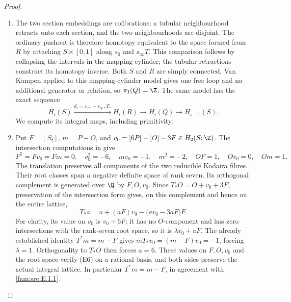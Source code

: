 \begin{proof}
\begin{enumerate}[label=\arabic*.,leftmargin=*]
\item The two section embeddings are cofibrations: a tubular neighbourhood
retracts onto each section, and the two neighbourhoods are disjoint.
The ordinary pushout is therefore homotopy equivalent to the space
formed from $R$ by attaching $S\times[0,1]$ along
$s_0$ and $s_\infty T$. This comparison follows by collapsing the
intervals in the mapping cylinder; the tubular retractions construct
its homotopy inverse. Both $S$ and $R$ are simply connected. Van
Kampen applied to this mapping-cylinder model gives one free loop
and no additional generator or relation, so $\pi_1(Q)=\Z$.
The same model has the exact sequence
\[
 H_i(S)\xrightarrow{d_i=s_{0*}-s_{\infty*}T_*}H_i(R)
 \longrightarrow H_i(Q)\longrightarrow H_{i-1}(S).             \tag{E4}
\]
We compute its integral maps, including primitivity.

\item Put $F=[S_t]$, $m=P-O$, and
$v_0=[6P]-[O]-3F\in H_2(S;\Z)$. The intersection computations in
\cite[Lemma 2.1]{Engel2026} give
\[
 F^2=Fv_0=Fm=0,\quad v_0^2=-6,\quad mv_0=-1,\quad m^2=-2,
 \quad OF=1,\quad Ov_0=0,\quad Om=1.                         \tag{E5}
\]
The translation preserves all components of the two reducible
Kodaira fibres. Their root classes span a negative definite space of
rank seven. Its orthogonal complement is generated over $\Q$ by
$F,O,v_0$. Since $T_*O=O+v_0+3F$, preservation of the intersection
form gives, on this complement and hence on the entire lattice,
\[
 T_*a=a+(aF)v_0-\bigl(av_0-3aF\bigr)F.                       \tag{E6}
\]
For clarity, its value on $v_0$ is $v_0+6F$: it has no $O$-component
and has zero intersections with the rank-seven root space, so it is
$\lambda v_0+aF$. The already established identity $T^*m=m-F$ gives
$mT_*v_0=(m-F)v_0=-1$, forcing $\lambda=1$. Orthogonality to
$T_*O$ then forces $a=6$. These
values on $F,O,v_0$ and the root space verify (E6) on a rational basis,
and both sides preserve the actual integral lattice. In particular
$T^*m=m-F$, in agreement with \ref{fam:src:E.1.1}.


\end{enumerate}
\end{proof}
